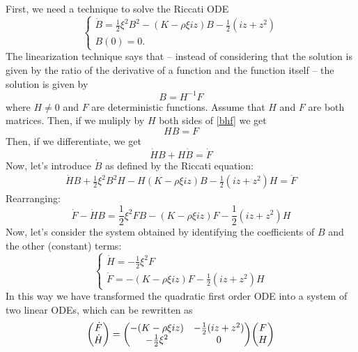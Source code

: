 First, we need a technique to solve the Riccati ODE
\begin{equation*}
    \begin{cases}
        \dot{B} = \frac{1}{2}\xi^2B^2 - (K-\rho\xi i z)B - \frac{1}{2}(iz+z^2) \\
        B(0) = 0.
    \end{cases}
\end{equation*}
The linearization technique says that -- instead of considering that the solution is given by the ratio of the derivative of a function and the function itself -- the solution is given by
\begin{equation}\label{bhf}
    B = H^{-1}F
\end{equation}
where $H \ne 0$ and $F$ are deterministic functions. Assume that $H$ and $F$ are both matrices. Then, if we muliply by $H$ both sides of \eqref{bhf} we get
\begin{equation*}
    HB = F
\end{equation*}
Then, if we differentiate, we get
\begin{equation*}
    \dot{H}B + H\dot{B} = \dot{F}
\end{equation*}
Now, let's introduce $\dot{B}$ as defined by the Riccati equation:
\begin{align*}
    \dot{H}B + \frac{1}{2}\xi^2B^2H - H(K-\rho\xi i z)B - \frac{1}{2}(iz+z^2)H = \dot{F}
\end{align*}
Rearranging:
\begin{equation*}
    \dot{F} - \dot{H}B = \frac{1}{2}\xi^2FB - (K-\rho\xi i z)F - \frac{1}{2}(iz+z^2)H
\end{equation*}
Now, let's consider the system obtained by identifying the coefficients of $B$ and the other (constant) terms:
\begin{equation*}
    \begin{cases}
        \dot{H} = -\frac{1}{2}\xi^2F \\
        \dot{F} = -(K-\rho\xi i z)F - \frac{1}{2}(iz+z^2)H
    \end{cases}
\end{equation*}
In this way we have transformed the quadratic first order ODE into a system of two linear ODEs, which can be rewritten as
\begin{equation}\label{HFlinearsys}
    \mqty(\dot{F}\\\dot{H}) = \mqty(-(K-\rho\xi iz) & - \frac{1}{2}(iz+z^2) \\ -\tfrac{1}{2}\xi^2 & 0) \mqty(F \\ H)
\end{equation}
